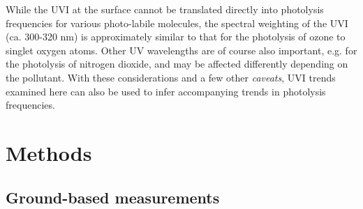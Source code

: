 \documentclass[10pt]{article}
\begin{document}
While the UVI at the surface cannot be translated directly into
photolysis frequencies for various photo-labile molecules, the spectral
weighting of the UVI (ca. 300-320 nm) is approximately similar to that
for the photolysis of ozone to singlet oxygen atoms. Other UV
wavelengths are of course also important, e.g. for the photolysis of
nitrogen dioxide, and may be affected differently depending on the
pollutant. With these considerations and a few other \emph{caveats}, UVI
trends examined here can also be used to infer accompanying trends in
photolysis frequencies.

\section*{Methods}

{\label{770133}}

\subsection*{Ground-based measurements}

{\label{220276}}
\end{document}
